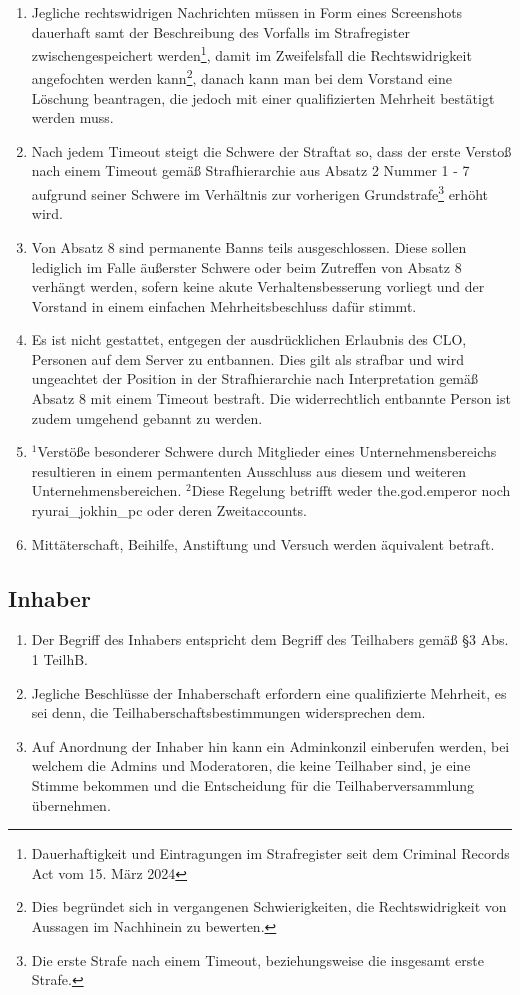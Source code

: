 \documentclass{article}
\begin{document}
\begin{enumerate}[(1)]
	\item Jegliche rechtswidrigen Nachrichten müssen in Form eines Screenshots dauerhaft samt der Beschreibung des Vorfalls im Strafregister zwischengespeichert werden\footnote{Dauerhaftigkeit und Eintragungen im Strafregister seit dem Criminal Records Act vom 15. März 2024}, damit im Zweifelsfall die Rechtswidrigkeit angefochten werden kann\footnote{Dies begründet sich in vergangenen Schwierigkeiten, die Rechtswidrigkeit von Aussagen im Nachhinein zu bewerten.}, danach kann man bei dem Vorstand eine Löschung beantragen, die jedoch mit einer qualifizierten Mehrheit bestätigt werden muss.
	\item Nach jedem Timeout steigt die Schwere der Straftat so, dass der erste Verstoß nach einem Timeout gemäß Strafhierarchie aus Absatz 2 Nummer 1 - 7 aufgrund seiner Schwere im Verhältnis zur vorherigen Grundstrafe\footnote{Die erste Strafe nach einem Timeout, beziehungsweise die insgesamt erste Strafe.} erhöht wird.
	\item Von Absatz 8 sind permanente Banns teils ausgeschlossen. Diese sollen lediglich im Falle äußerster Schwere oder beim Zutreffen von Absatz 8 verhängt werden, sofern keine akute Verhaltensbesserung vorliegt und der Vorstand in einem einfachen Mehrheitsbeschluss dafür stimmt.
	\item Es ist nicht gestattet, entgegen der ausdrücklichen Erlaubnis des CLO, Personen auf dem Server zu entbannen. Dies gilt als strafbar und wird ungeachtet der Position in der Strafhierarchie nach Interpretation gemäß Absatz 8 mit einem Timeout bestraft. Die widerrechtlich entbannte Person ist zudem umgehend gebannt zu werden.
	\item $^{1}$Verstöße besonderer Schwere durch Mitglieder eines Unternehmensbereichs resultieren in einem permantenten Ausschluss aus diesem und weiteren Unternehmensbereichen. $^{2}$Diese Regelung betrifft weder the.god.emperor noch ryurai\_jokhin\_pc oder deren Zweitaccounts.
	\item Mittäterschaft, Beihilfe, Anstiftung und Versuch werden äquivalent betraft.
\end{enumerate}

\subsection{Inhaber}
\begin{enumerate}[(1)]
	\item Der Begriff des Inhabers entspricht dem Begriff des Teilhabers gemäß §3 Abs. 1 TeilhB.
	\item Jegliche Beschlüsse der Inhaberschaft erfordern eine qualifizierte Mehrheit, es sei denn, die Teilhaberschaftsbestimmungen widersprechen dem.
	\item Auf Anordnung der Inhaber hin kann ein Adminkonzil einberufen werden, bei welchem die Admins und Moderatoren, die keine Teilhaber sind, je eine Stimme bekommen und die Entscheidung für die Teilhaberversammlung übernehmen.
\end{enumerate}
\end{document}
